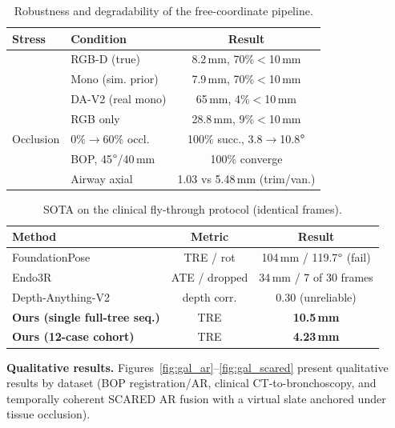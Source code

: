 \documentclass[9pt,twoside,web]{ieeecolor2}
\begin{document}
\begin{table}[t]
\centering
\caption{Robustness and degradability of the free-coordinate pipeline.}
\label{tab:robust}
\setlength{\tabcolsep}{3pt}\small
\begin{tabular}{llc}
\toprule
Stress & Condition & Result \\
\midrule
{} & RGB-D (true) & 8.2\,mm, 70\%$<$10\,mm \\
 & Mono (sim. prior) & 7.9\,mm, 70\%$<$10\,mm \\
 & DA-V2 (real mono) & 65\,mm, 4\%$<$10\,mm \\
 & RGB only & 28.8\,mm, 9\%$<$10\,mm \\
\midrule
Occlusion & 0\%$\to$60\% occl. & 100\% succ., 3.8$\to$10.8$\degree$ \\
\midrule
{} & BOP, 45$\degree$/40\,mm & 100\% converge \\
 & Airway axial & 1.03 vs 5.48\,mm (trim/van.) \\
\bottomrule
\end{tabular}
\end{table}

\begin{table}[t]
\centering
\caption{SOTA on the clinical fly-through protocol (identical frames).}
\label{tab:sota}
\begin{tabular}{lcc}
\toprule
Method & Metric & Result \\
\midrule
FoundationPose & TRE / rot & 104\,mm / 119.7$\degree$ (fail) \\
Endo3R & ATE / dropped & 34\,mm / 7 of 30 frames \\
Depth-Anything-V2 & depth corr. & 0.30 (unreliable) \\
\textbf{Ours (single full-tree seq.)} & TRE & \textbf{10.5\,mm} \\
\textbf{Ours (12-case cohort)} & TRE & \textbf{4.23\,mm} \\
\bottomrule
\end{tabular}
\end{table}

\textbf{Qualitative results.} Figures~\ref{fig:gal_ar}--\ref{fig:gal_scared} present qualitative results by dataset (BOP registration/AR, clinical CT-to-bronchoscopy, and temporally coherent SCARED AR fusion with a virtual slate anchored under tissue occlusion).

\end{document}
